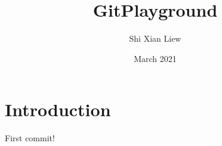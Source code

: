 \documentclass{article}
\title{GitPlayground}
\author{Shi Xian Liew}
\date{March 2021}
\begin{document}
\maketitle

\section{Introduction}
First commit!
\end{document}
